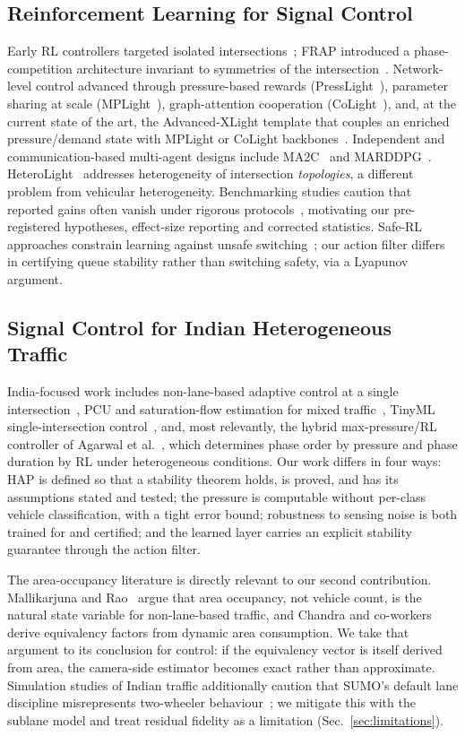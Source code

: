 \documentclass[journal]{IEEEtran}
\begin{document}
\subsection{Reinforcement Learning for Signal Control}
Early RL controllers targeted isolated
intersections~\cite{b_thorpe,b_abdulhai,b_intellilight}; FRAP introduced
a phase-competition architecture invariant to symmetries of the
intersection~\cite{b_frap}. Network-level control advanced through
pressure-based rewards (PressLight~\cite{b_presslight}), parameter
sharing at scale (MPLight~\cite{b_mplight}), graph-attention cooperation
(CoLight~\cite{b_colight}), and, at the current state of the art, the
Advanced-XLight template that couples an enriched pressure/demand state
with MPLight or CoLight backbones~\cite{b_advxlight}. Independent and
communication-based multi-agent designs include MA2C~\cite{b_ma2c} and
MARDDPG~\cite{b_marddpg}. HeteroLight~\cite{b_heterolight} addresses
heterogeneity of intersection \emph{topologies}, a different problem from
vehicular heterogeneity. Benchmarking studies caution that reported gains
often vanish under rigorous protocols~\cite{b_resco}, motivating our
pre-registered hypotheses, effect-size reporting and corrected
statistics. Safe-RL approaches constrain learning against unsafe
switching~\cite{b_safelight}; our action filter differs in certifying
queue stability rather than switching safety, via a Lyapunov argument.

\subsection{Signal Control for Indian Heterogeneous Traffic}
India-focused work includes non-lane-based adaptive control at a single
intersection~\cite{b_patel_adaptive}, PCU and saturation-flow estimation
for mixed traffic~\cite{b_radha,b_biswas,b_mallikarjuna,b_chandra},
TinyML single-intersection control~\cite{b_tolani}, and, most relevantly,
the hybrid max-pressure/RL controller of Agarwal et
al.~\cite{b_agarwal}, which determines phase order by pressure and phase
duration by RL under heterogeneous conditions. Our work differs in four
ways: HAP is defined so that a stability theorem holds, is proved, and
has its assumptions stated and tested; the pressure is computable without
per-class vehicle classification, with a tight error bound; robustness to
sensing noise is both trained for and certified; and the learned layer
carries an explicit stability guarantee through the action filter.

The area-occupancy literature is directly relevant to our second
contribution. Mallikarjuna and Rao~\cite{b_mallikarjuna} argue that area
occupancy, not vehicle count, is the natural state variable for
non-lane-based traffic, and Chandra and
co-workers~\cite{b_chandra,b_biswas} derive equivalency factors from
dynamic area consumption. We take that argument to its conclusion for
control: if the equivalency vector is itself derived from area, the
camera-side estimator becomes exact rather than approximate.
Simulation studies of Indian traffic additionally caution that SUMO's
default lane discipline misrepresents two-wheeler
behaviour~\cite{b_simtram}; we mitigate this with the sublane model and
treat residual fidelity as a limitation (Sec.~\ref{sec:limitations}).
\end{document}
